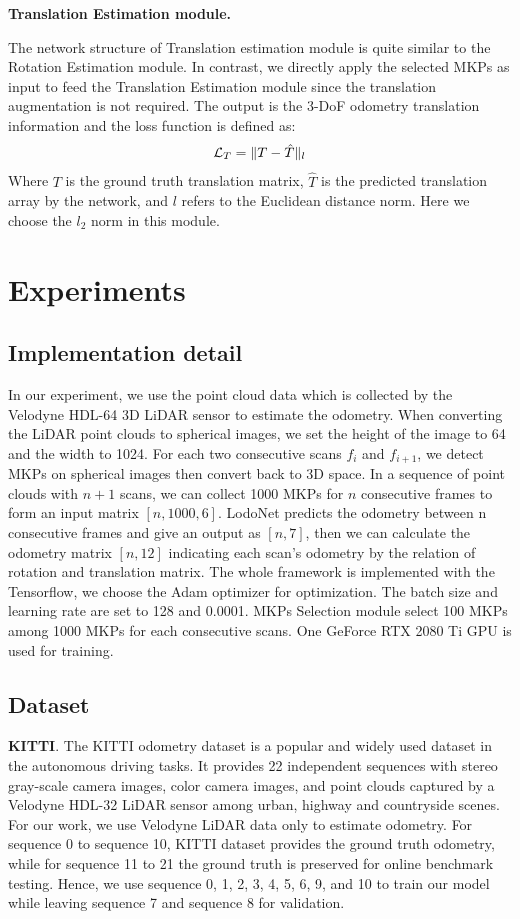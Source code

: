 \documentclass[sigconf]{acmart}
\def\lodo{LodoNet}
\newcommand{\bfsection}[1]{\vspace*{0.1cm}\noindent\textbf{#1.}}
\begin{document}
\bfsection{Translation Estimation module}

The network structure of Translation estimation module is quite similar to the Rotation Estimation module. In contrast, we directly apply the selected MKPs as input to feed the Translation Estimation module since the translation augmentation is not required. The output is the 3-DoF odometry translation information and the loss function is defined as: 
\begin{align}
\small
    \mathcal{L}_T =\|  T - \hat{T} \|_l 
\end{align}
Where $T$ is the ground truth translation matrix, $\hat{T}$ is the predicted translation array by the network, and $l$ refers to the Euclidean distance norm. Here we choose the $l_2$ norm in this module. 

\section{Experiments}
\subsection{Implementation detail}
\label{section:Implementation detail}
In our experiment, we use the point cloud data which is collected by the Velodyne HDL-64 3D LiDAR sensor to estimate the odometry. When converting the LiDAR point clouds to spherical images, we set the height of the image to 64 and the width to 1024. For each two consecutive scans $f_i$ and $f_{i+1}$, we detect MKPs on spherical images then convert back to 3D space. In a sequence of point clouds with $n+1$ scans, we can collect 1000 MKPs for $n$ consecutive frames to form an input matrix $[n, 1000, 6]$. \lodo{} predicts the odometry between n consecutive frames and give an output as $[n, 7]$, then we can calculate the odometry matrix $[n, 12]$ indicating each scan’s odometry by the relation of rotation and translation matrix. The whole framework is implemented with the Tensorflow, we choose the Adam optimizer\cite{adam} for optimization. The batch size and learning rate are set to 128 and 0.0001. MKPs Selection module select 100 MKPs among 1000 MKPs for each consecutive scans. One GeForce RTX 2080 Ti GPU is used for training. 

\subsection{Dataset}

\quad \textbf{KITTI}. The KITTI odometry dataset\cite{kitti} is a popular and widely used dataset in the autonomous driving tasks. It provides 22 independent sequences with stereo gray-scale camera images, color camera images, and point clouds captured by a Velodyne HDL-32 LiDAR sensor among urban, highway and countryside scenes. For our work, we use Velodyne LiDAR data only to estimate odometry. For sequence 0 to sequence 10, KITTI dataset provides the ground truth odometry, while for sequence 11 to 21 the ground truth is preserved for online benchmark testing. Hence, we use sequence 0, 1, 2, 3, 4, 5, 6, 9, and 10 to train our model while leaving sequence 7 and sequence 8 for validation. 
\end{document}
